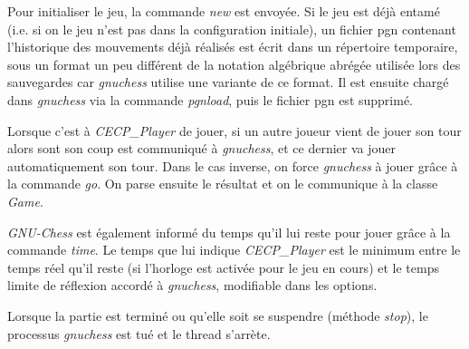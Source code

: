 \documentclass[11pt]{article}
\begin{document}
Pour initialiser le jeu, la commande \textit{new} est envoyée. Si le jeu est déjà entamé (i.e. si on le jeu n'est pas dans la configuration initiale), un fichier pgn contenant l'historique des mouvements déjà réalisés est écrit dans un répertoire temporaire,
sous un format un peu différent de la notation algébrique abrégée utilisée lors des sauvegardes car \textit{gnuchess} utilise une variante de ce format. Il est ensuite chargé dans \textit{gnuchess} via la commande \textit{pgnload}, puis le fichier pgn est supprimé.

\-

Lorsque c'est à \textit{CECP\_Player} de jouer, si un autre joueur vient de jouer son tour alors sont son coup est communiqué à \textit{gnuchess}, et ce dernier va jouer automatiquement son tour. Dans le cas inverse, on force \textit{gnuchess} à jouer grâce à la commande \textit{go}. On parse ensuite le résultat et on le communique à la classe \textit{Game}.

\-

\textit{GNU-Chess} est également informé du temps qu'il lui reste pour jouer grâce à la commande \textit{time}. Le temps que lui indique \textit{CECP\_Player} est le minimum entre le temps réel qu'il reste (si l'horloge est activée pour le jeu en cours) et le temps limite de réflexion accordé à \textit{gnuchess}, modifiable dans les options.

\-

Lorsque la partie est terminé ou qu'elle soit se suspendre (méthode \textit{stop}), le processus \textit{gnuchess} est tué et le thread
s'arrète.

\-
\end{document}
